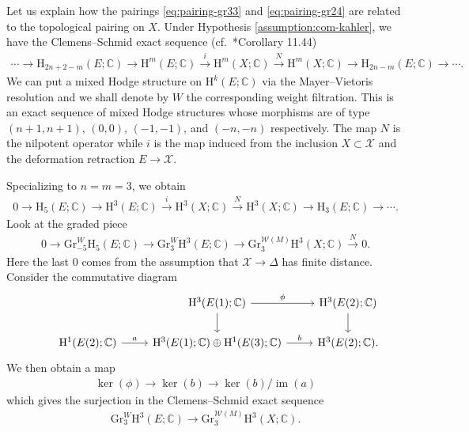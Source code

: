 Let us explain how the pairings \eqref{eq:pairing-gr33} and
\eqref{eq:pairing-gr24} are related to the topological pairing on \(X\).
Under Hypothesis \ref{assumption:com-kahler}, we have the Clemens--Schmid exact 
sequence (cf.~\cite{2008-Peters-Steenbrink-mixed-Hodge-structures}*{Corollary 11.44})
\begin{eqnarray*}
\cdots\to\mathrm{H}_{2n+2-m}(E;\mathbb{C})\to
\mathrm{H}^{m}(E;\mathbb{C})\xrightarrow{i}
\mathrm{H}^{m}(X;\mathbb{C})\xrightarrow{N}
\mathrm{H}^{m}(X;\mathbb{C})\to\mathrm{H}_{2n-m}(E;\mathbb{C})\to\cdots.
\end{eqnarray*}
We can put a mixed Hodge structure on 
\(\mathrm{H}^{k}(E;\mathbb{C})\) via the Mayer--Vietoris resolution and
we shall denote by \(W\) the corresponding weight filtration.
This is an exact sequence of mixed Hodge structures
whose morphisms are of type \((n+1,n+1)\), \((0,0)\), \((-1,-1)\),
and \((-n,-n)\) respectively. The map \(N\) is the nilpotent operator while
\(i\) is the map induced from the inclusion \(X\subset \mathcal{X}\) and
the deformation retraction \(E\to \mathcal{X}\).

Specializing to \(n=m=3\), we obtain
\begin{eqnarray*}
0\to\mathrm{H}_{5}(E;\mathbb{C})\to
\mathrm{H}^{3}(E;\mathbb{C})\xrightarrow{i}
\mathrm{H}^{3}(X;\mathbb{C})\xrightarrow{N}
\mathrm{H}^{3}(X;\mathbb{C})\to\mathrm{H}_{3}(E;\mathbb{C})\to\cdots.
\end{eqnarray*}
Look at the graded piece
\begin{eqnarray*}
0\to\mathrm{Gr}_{-5}^{W}\mathrm{H}_{5}(E;\mathbb{C})
\to \mathrm{Gr}_{3}^{W}\mathrm{H}^{3}(E;\mathbb{C})
\to \mathrm{Gr}_{3}^{\mathcal{W}(M)}\mathrm{H}^{3}(X;\mathbb{C})\xrightarrow{N} 0.
\end{eqnarray*}
Here the last \(0\) comes from the assumption that \(\mathcal{X}\to \Delta\)
has finite distance. 
Consider the commutative diagram
\begin{eqnarray*}
\begin{tikzcd}
& &\mathrm{H}^{3}(E(1);\mathbb{C})\ar[r,"\phi"]\ar[d]&\mathrm{H}^{3}(E(2);\mathbb{C})\ar[d]\\
&\mathrm{H}^{1}(E(2);\mathbb{C})\ar[r,"a"]
&\mathrm{H}^{3}(E(1);\mathbb{C})\oplus\mathrm{H}^{1}(E(3);\mathbb{C})\ar[r,"b"]
&\mathrm{H}^{3}(E(2);\mathbb{C}).
\end{tikzcd}
\end{eqnarray*}
We then obtain a map
\begin{eqnarray*}
\operatorname{ker}(\phi)\to \operatorname{ker}(b)\to 
\operatorname{ker}(b)\slash \operatorname{im}(a)
\end{eqnarray*}
which gives the surjection in the Clemens--Schmid exact sequence
\begin{eqnarray*}
\mathrm{Gr}_{3}^{W}\mathrm{H}^{3}(E;\mathbb{C})
\to \mathrm{Gr}_{3}^{\mathcal{W}(M)}\mathrm{H}^{3}(X;\mathbb{C}).
\end{eqnarray*}

